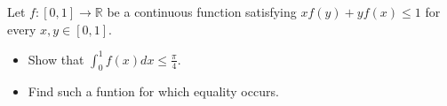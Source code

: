 Let \(f\colon  [0,1]\to\mathbb{R}\) be a continuous function satisfying \(xf(y)+yf(x)\le 1\) for every \(x,y\in[0,1]\).\begin{itemize}

\item[(a)] Show that \(\int^1_0 f(x)dx \le \frac{\pi}4\).
\item[(b)] Find such a funtion for which equality occurs.
\end{itemize}
